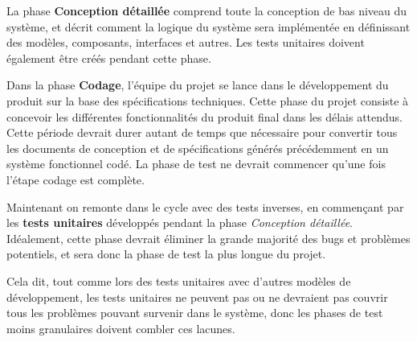 La phase \textbf{Conception détaillée} comprend toute la conception de bas niveau du système, et décrit comment la logique du système sera implémentée en définissant des modèles, composants, interfaces et autres. Les tests unitaires doivent également être créés pendant cette phase.



Dans la phase \textbf{Codage}, l’équipe du projet se lance dans le développement du produit sur la base des spécifications techniques. Cette phase du projet consiste à concevoir les différentes fonctionnalités du produit final dans les délais attendus. Cette période devrait durer autant de temps que nécessaire pour convertir tous les documents de conception et de spécifications générés précédemment en un système fonctionnel codé. La phase de test ne devrait commencer qu'une fois l'étape codage est complète.


Maintenant on remonte dans le cycle avec des tests inverses, en commençant par les \textbf{tests unitaires} développés pendant la phase \textit{Conception détaillée}. Idéalement, cette phase devrait éliminer la grande majorité des bugs et problèmes potentiels, et sera donc la phase de test la plus longue du projet.

Cela dit, tout comme lors des tests unitaires avec d'autres modèles de développement, les tests unitaires ne peuvent pas ou ne devraient pas couvrir tous les problèmes pouvant survenir dans le système, donc les phases de test moins granulaires doivent combler ces lacunes.

